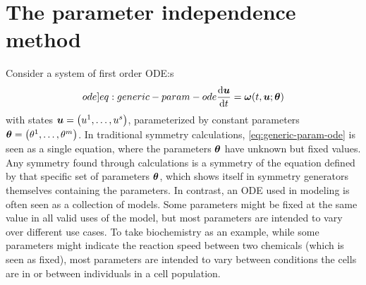 \section{The parameter independence method}

Consider a system of first order ODE:s
\begin{equation} \label[ode]{eq:generic-param-ode}
  \diff{\vect{u}}{t} = \vect{\omega}(t, \vect{u}; \vect{\theta})
\end{equation}
with states \(\vect{u} = \left(u^1, \dots, u^s\right)\), parameterized by constant parameters \(\vect{\theta} = \left(\theta^1, \dots, \theta^m\right)\).
In traditional symmetry calculations, \cref{eq:generic-param-ode} is seen as a single equation, where the parameters \(\boldsymbol{\theta}\) have unknown but fixed values.
Any symmetry found through calculations is a symmetry of the equation defined by that specific set of parameters \(\boldsymbol{\theta}\), which shows itself in symmetry generators themselves containing the parameters.
In contrast, an ODE used in modeling is often seen as a collection of models.
Some parameters might be fixed at the same value in all valid uses of the model, but most parameters are intended to vary over different use cases.
To take biochemistry as an example, while some parameters might indicate the reaction speed between two chemicals (which is seen as fixed), most parameters are intended to vary between conditions the cells are in or between individuals in a cell population.

